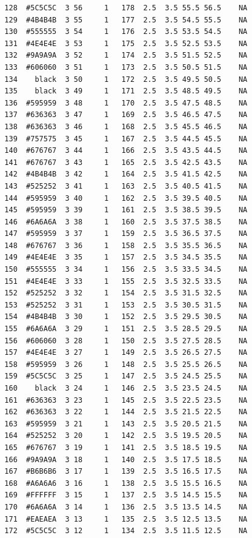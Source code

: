 \documentclass[12pt,twoside]{reedthesis}
\begin{document}
\begin{verbatim}
  128  #5C5C5C  3 56     1   178  2.5  3.5 55.5 56.5    NA
  129  #4B4B4B  3 55     1   177  2.5  3.5 54.5 55.5    NA
  130  #555555  3 54     1   176  2.5  3.5 53.5 54.5    NA
  131  #4E4E4E  3 53     1   175  2.5  3.5 52.5 53.5    NA
  132  #9A9A9A  3 52     1   174  2.5  3.5 51.5 52.5    NA
  133  #606060  3 51     1   173  2.5  3.5 50.5 51.5    NA
  134    black  3 50     1   172  2.5  3.5 49.5 50.5    NA
  135    black  3 49     1   171  2.5  3.5 48.5 49.5    NA
  136  #595959  3 48     1   170  2.5  3.5 47.5 48.5    NA
  137  #636363  3 47     1   169  2.5  3.5 46.5 47.5    NA
  138  #636363  3 46     1   168  2.5  3.5 45.5 46.5    NA
  139  #757575  3 45     1   167  2.5  3.5 44.5 45.5    NA
  140  #676767  3 44     1   166  2.5  3.5 43.5 44.5    NA
  141  #676767  3 43     1   165  2.5  3.5 42.5 43.5    NA
  142  #4B4B4B  3 42     1   164  2.5  3.5 41.5 42.5    NA
  143  #525252  3 41     1   163  2.5  3.5 40.5 41.5    NA
  144  #595959  3 40     1   162  2.5  3.5 39.5 40.5    NA
  145  #595959  3 39     1   161  2.5  3.5 38.5 39.5    NA
  146  #6A6A6A  3 38     1   160  2.5  3.5 37.5 38.5    NA
  147  #595959  3 37     1   159  2.5  3.5 36.5 37.5    NA
  148  #676767  3 36     1   158  2.5  3.5 35.5 36.5    NA
  149  #4E4E4E  3 35     1   157  2.5  3.5 34.5 35.5    NA
  150  #555555  3 34     1   156  2.5  3.5 33.5 34.5    NA
  151  #4E4E4E  3 33     1   155  2.5  3.5 32.5 33.5    NA
  152  #525252  3 32     1   154  2.5  3.5 31.5 32.5    NA
  153  #525252  3 31     1   153  2.5  3.5 30.5 31.5    NA
  154  #4B4B4B  3 30     1   152  2.5  3.5 29.5 30.5    NA
  155  #6A6A6A  3 29     1   151  2.5  3.5 28.5 29.5    NA
  156  #606060  3 28     1   150  2.5  3.5 27.5 28.5    NA
  157  #4E4E4E  3 27     1   149  2.5  3.5 26.5 27.5    NA
  158  #595959  3 26     1   148  2.5  3.5 25.5 26.5    NA
  159  #5C5C5C  3 25     1   147  2.5  3.5 24.5 25.5    NA
  160    black  3 24     1   146  2.5  3.5 23.5 24.5    NA
  161  #636363  3 23     1   145  2.5  3.5 22.5 23.5    NA
  162  #636363  3 22     1   144  2.5  3.5 21.5 22.5    NA
  163  #595959  3 21     1   143  2.5  3.5 20.5 21.5    NA
  164  #525252  3 20     1   142  2.5  3.5 19.5 20.5    NA
  165  #676767  3 19     1   141  2.5  3.5 18.5 19.5    NA
  166  #9A9A9A  3 18     1   140  2.5  3.5 17.5 18.5    NA
  167  #B6B6B6  3 17     1   139  2.5  3.5 16.5 17.5    NA
  168  #A6A6A6  3 16     1   138  2.5  3.5 15.5 16.5    NA
  169  #FFFFFF  3 15     1   137  2.5  3.5 14.5 15.5    NA
  170  #6A6A6A  3 14     1   136  2.5  3.5 13.5 14.5    NA
  171  #EAEAEA  3 13     1   135  2.5  3.5 12.5 13.5    NA
  172  #5C5C5C  3 12     1   134  2.5  3.5 11.5 12.5    NA

\end{verbatim}
\end{document}
